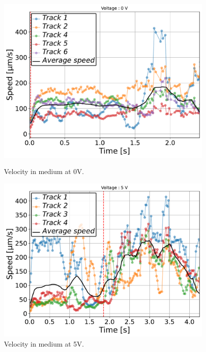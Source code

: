 \begin{figure}[H]
    \centering
    \begin{minipage}[t]{0.49\textwidth}
        \centering
        \includegraphics[width=0.95\textwidth]{Figures/2.5mM_0V_007_velocity_time.pdf}
        \caption{Velocity in  medium at 0V.}
        \label{fig:velocity_time_Ca_0V}
    \end{minipage}
    \hfill
    \begin{minipage}[t]{0.49\textwidth}
        \centering
        \includegraphics[width=0.95\textwidth]{Figures/2.5mM_5V_003_velocity_time.pdf}
        \caption{Velocity in  medium at 5V.}
        \label{fig:velocity_time_Ca_5V}
    \end{minipage}
\end{figure}

